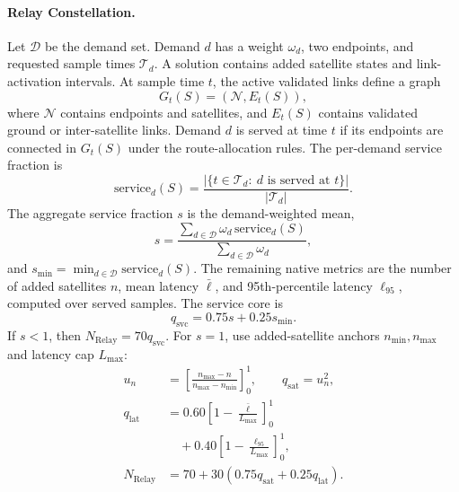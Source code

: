 \documentclass[]{mosi}
\begin{document}
\paragraph{Relay Constellation.} Let \(\mathcal{D}\) be the demand set. Demand \(d\) has a weight \(\omega_d\), two endpoints, and requested sample times \(\mathcal{T}_d\). A solution contains added satellite states and link-activation intervals. At sample time \(t\), the active validated links define a graph
\[
  G_t(S)=(\mathcal{N},E_t(S)),
\]
where \(\mathcal{N}\) contains endpoints and satellites, and \(E_t(S)\) contains validated ground or inter-satellite links. Demand \(d\) is served at time \(t\) if its endpoints are connected in \(G_t(S)\) under the route-allocation rules. The per-demand service fraction is
\[
  \mathrm{service}_d(S)=
  \frac{|\{t\in\mathcal{T}_d:\ d\text{ is served at }t\}|}{|\mathcal{T}_d|}.
\]
The aggregate service fraction \(s\) is the demand-weighted mean,
\[
  s=\frac{\sum_{d\in\mathcal{D}}\omega_d\,\mathrm{service}_d(S)}{\sum_{d\in\mathcal{D}}\omega_d},
\]
and \(s_{\min}=\min_{d\in\mathcal{D}}\mathrm{service}_d(S)\). The remaining native metrics are the number of added satellites \(n\), mean latency \(\bar{\ell}\), and 95th-percentile latency \(\ell_{95}\), computed over served samples. The service core is
\[
  q_{\mathrm{svc}}=0.75s+0.25s_{\min}.
\]
If \(s<1\), then \(N_{\mathrm{Relay}}=70q_{\mathrm{svc}}\). For \(s=1\), use added-satellite anchors \(n_{\min},n_{\max}\) and latency cap \(L_{\max}\):
\[
  \begin{aligned}
  u_n&=\left[\frac{n_{\max}-n}{n_{\max}-n_{\min}}\right]_0^1,
  \qquad q_{\mathrm{sat}}=u_n^2,\\
  q_{\mathrm{lat}}&=0.60\left[1-\frac{\bar{\ell}}{L_{\max}}\right]_0^1\\
  &\quad+0.40\left[1-\frac{\ell_{95}}{L_{\max}}\right]_0^1,\\
  N_{\mathrm{Relay}}&=70+30(0.75q_{\mathrm{sat}}+0.25q_{\mathrm{lat}}).
  \end{aligned}
\]
\end{document}
